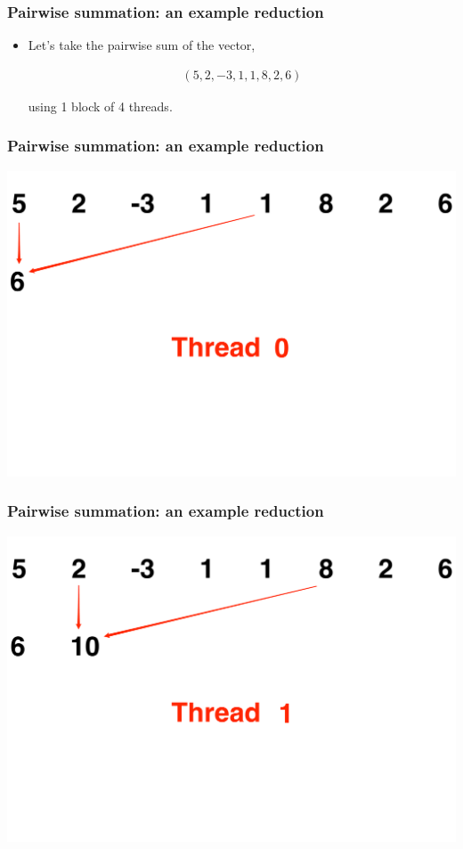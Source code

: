 \documentclass[handout]{beamer}
\numberwithin{equation}{section}
\begin{document}
\begin{frame}
\frametitle{Pairwise summation: an example reduction}

\begin{itemize}
\item Let's take the pairwise sum of the vector,

\begin{align*}
(5, 2, -3, 1, 1, 8, 2, 6)
\end{align*}

using 1 block of 4 threads.
\end{itemize}
\end{frame}

\begin{frame}
\frametitle{Pairwise summation: an example reduction}
\includegraphics[scale=.15]{fig/psum1.pdf}
\end{frame}

\begin{frame}
\frametitle{Pairwise summation: an example reduction}
\includegraphics[scale=.15]{fig/psum2.pdf}
\end{frame}
\end{document}
